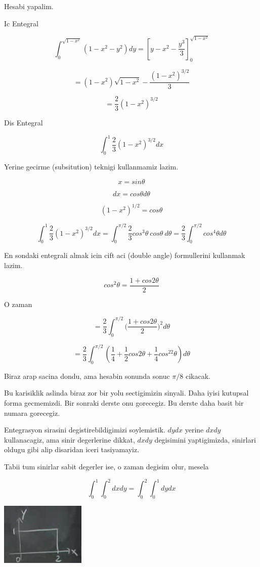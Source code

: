 \documentclass[12pt,fleqn]{article}\usepackage{../common}
\begin{document}
Hesabi yapalim. 

Ic Entegral 

\[  \int_0^{\sqrt{1-x^2}}  (1-x^2-y^2) dy = 
[ y - x^2 - \frac{y^3}{3} ]_0^{\sqrt{1-x^2}}
 \]

\[ =  (1-x^2)\sqrt{1-x^2} - \frac{(1-x^2)^{3/2}}{3}\]

\[ = \frac{2}{3} (1-x^2)^{3/2} \]

Dis Entegral

\[ \int_0^1 \frac{2}{3} (1-x^2)^{3/2} dx \]

Yerine gecirme (subsitution) teknigi kullanmamiz lazim. 

\[ x = sin\theta \]

\[ dx = cos\theta d\theta\]

\[ (1-x^2)^{1/2} = cos\theta \]

\[ 
\int_0^1 \frac{2}{3} (1-x^2)^{3/2} dx = 
\int_0^{\pi/2} \frac{2}{3} cos^3\theta \ cos\theta \ d\theta = 
\frac{2}{3} \int_0^{\pi/2} cos^4\theta d\theta
\]

En sondaki entegrali almak icin cift aci (double angle) formullerini
kullanmak lazim. 

\[ cos^2\theta = \frac{1 + cos 2\theta}{2} \]

O zaman 

\[ = 
\frac{2}{3} \int_0^{\pi/2} 
\bigg( \frac{1 + cos 2\theta}{2} \bigg)^2 d\theta 
\]

\[ = \frac{2}{3} \int_0^{\pi/2} (
\frac{1}{4} + 
\frac{1}{2}cos2\theta + 
\frac{1}{4}cos^22\theta)d\theta
 \]

Biraz arap sacina dondu, ama hesabin sonunda sonuc $\pi/8$ cikacak. 

Bu karisiklik aslinda biraz zor bir yolu sectigimizin sinyali. Daha iyisi
kutupsal forma gecmemizdi. Bir sonraki derste onu gorecegiz. Bu derste daha
basit bir numara gorecegiz. 

Entegrasyon sirasini degistirebildigimizi soylemistik. $dy dx$ 
yerine $dx
dy$ kullanacagiz, ama sinir degerlerine dikkat, $dx dy$ degisimini
yaptigimizda, sinirlari oldugu gibi alip disaridan iceri tasiyamayiz. 

Tabii tum sinirlar sabit degerler ise, o zaman degisim olur, mesela

\[ \int_0^1 \int_0^2 dx dy =
\int_0^2 \int_0^1 dy dx
\]


\includegraphics[height=3cm]{16_12.png}
\end{document}
